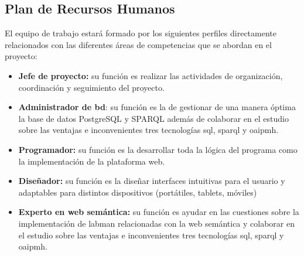 \subsection{Plan de Recursos Humanos}\label{sec:planRecursosHumanos}

El equipo de trabajo estará formado por los siguientes perfiles directamente relacionados con las diferentes áreas de competencias que se abordan en el proyecto: 

\begin{itemize}
	\item \textbf{Jefe de proyecto:} su función es realizar las actividades de organización, coordinación y seguimiento del proyecto.
	\item \textbf{Administrador de \acrlong{bd}}: su función es la de gestionar de una manera óptima la base de datos PostgreSQL y SPARQL además de colaborar en el estudio sobre las ventajas e inconvenientes tres tecnologías \acrshort{sql}, \acrshort{sparql} y \acrshort{oaipmh}. 
	\item \textbf{Programador:} su función es la desarrollar toda la lógica del programa como la implementación de la plataforma web. 
	\item \textbf{Diseñador:} su función es la diseñar interfaces intuitivas para el usuario y adaptables para distintos dispositivos (portátiles, tablets, móviles) 
	\item \textbf{Experto en web semántica:} su función es ayudar en las cuestiones sobre la implementación de \acrshort{labman} relacionadas con la web semántica y colaborar en el estudio sobre las ventajas e inconvenientes tres tecnologías \acrshort{sql}, \acrshort{sparql} y \acrshort{oaipmh}.
\end{itemize}